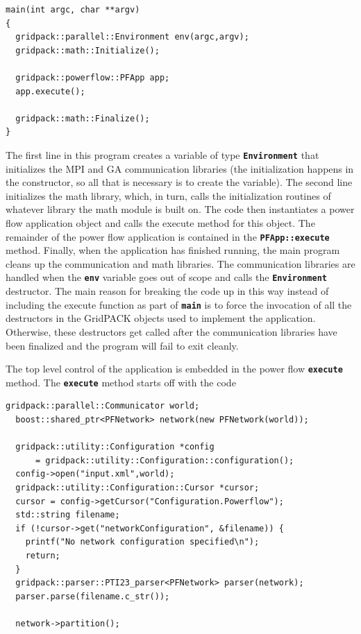 \documentclass[12pt]{report} %
\begin{document}
{
\color{red}
\begin{Verbatim}[fontseries=b]
main(int argc, char **argv)
{
  gridpack::parallel::Environment env(argc,argv);
  gridpack::math::Initialize();

  gridpack::powerflow::PFApp app;
  app.execute();

  gridpack::math::Finalize();
}
\end{Verbatim}
}

The first line in this program creates a variable of type \texttt{\textbf{Environment}} that initializes the MPI and GA communication libraries (the initialization happens in the constructor, so all that is necessary is to create the variable). The second line initializes the math library, which, in turn, calls the initialization routines of whatever library the math module is built on. The code then instantiates a power flow application object and calls the execute method for this object. The remainder of the power flow application is contained in the \texttt{\textbf{PFApp::execute}} method. Finally, when the application has finished running, the main program cleans up the communication and math libraries. The communication libraries are handled when the \texttt{\textbf{env}} variable goes out of scope and calls the \texttt{\textbf{Environment}} destructor. The main reason for breaking the code up in this way instead of including the execute function as part of \texttt{\textbf{main}} is to force the invocation of all the destructors in the GridPACK objects used to implement the application. Otherwise, these destructors get called after the communication libraries have been finalized and the program will fail to exit cleanly.

The top level control of the application is embedded in the power flow \texttt{\textbf{execute}} method. The \texttt{\textbf{execute}} method starts off with the code

{
\color{red}
\begin{Verbatim}[fontseries=b]
  gridpack::parallel::Communicator world;
  boost::shared_ptr<PFNetwork> network(new PFNetwork(world));

  gridpack::utility::Configuration *config
      = gridpack::utility::Configuration::configuration();
  config->open("input.xml",world);
  gridpack::utility::Configuration::Cursor *cursor;
  cursor = config->getCursor("Configuration.Powerflow");
  std::string filename;
  if (!cursor->get("networkConfiguration", &filename)) {
    printf("No network configuration specified\n");
    return;
  }
  gridpack::parser::PTI23_parser<PFNetwork> parser(network);
  parser.parse(filename.c_str());
  
  network->partition();
\end{Verbatim}
}
\end{document}
